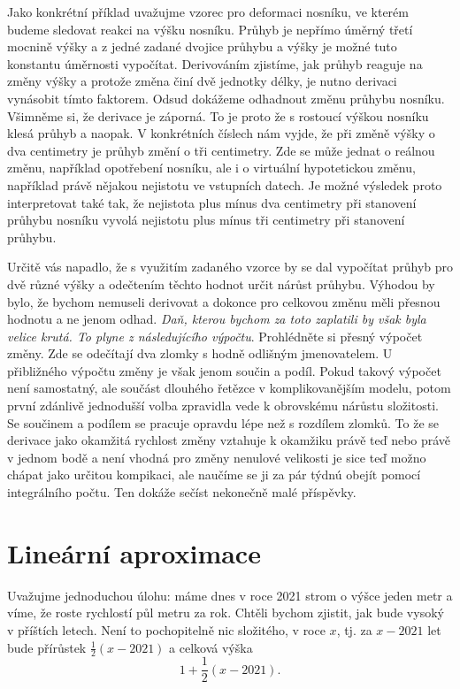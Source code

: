 \documentclass[12pt]{article}
\begin{document}
Jako konkrétní příklad uvažujme vzorec pro deformaci nosníku, ve kterém budeme sledovat reakci na výšku nosníku. Průhyb je nepřímo úměrný třetí mocnině výšky a z jedné zadané dvojice průhybu a výšky je možné tuto konstantu úměrnosti vypočítat. Derivováním zjistíme, jak průhyb reaguje na změny výšky a protože změna činí dvě jednotky délky, je nutno derivaci vynásobit tímto faktorem. Odsud dokážeme odhadnout změnu průhybu nosníku. Všimněme si, že derivace je záporná. To je proto že s rostoucí výškou nosníku klesá průhyb a naopak. V konkrétních číslech nám vyjde, že při změně výšky o dva centimetry je průhyb změní o tři centimetry. Zde se může jednat o reálnou změnu, například opotřebení nosníku, ale i o virtuální hypotetickou změnu, například právě nějakou nejistotu ve vstupních datech. Je možné výsledek proto interpretovat také tak, že nejistota plus mínus dva centimetry při stanovení průhybu nosníku vyvolá nejistotu plus mínus tři centimetry při stanovení průhybu.

Určitě vás napadlo, že s využitím zadaného vzorce by se dal vypočítat průhyb pro dvě různé výšky a odečtením těchto hodnot určit nárůst průhybu. Výhodou by bylo, že bychom nemuseli derivovat a dokonce pro celkovou změnu měli přesnou hodnotu a ne jenom odhad. \textit{Daň, kterou bychom za toto zaplatili by však byla velice krutá. To plyne z následujícího výpočtu}. Prohlédněte si přesný výpočet změny. Zde se odečítají dva zlomky s hodně odlišným jmenovatelem. U přibližného výpočtu změny je však jenom součin a podíl. Pokud takový výpočet není samostatný, ale součást dlouhého řetězce v komplikovanějším modelu, potom první zdánlivě jednodušší volba zpravidla vede k obrovskému nárůstu složitosti. Se součinem a podílem se pracuje opravdu lépe než s rozdílem zlomků. To že se derivace jako okamžitá rychlost změny vztahuje k okamžiku právě teď nebo právě v jednom bodě a není vhodná pro změny nenulové velikosti je sice teď možno chápat jako určitou kompikaci, ale naučíme se ji za pár týdnú obejít pomocí integrálního počtu. Ten dokáže sečíst nekonečně malé příspěvky.

\section*{Lineární aproximace}

Uvažujme jednoduchou úlohu: máme dnes v roce 2021 strom o výšce jeden metr a víme, že roste rychlostí půl metru za rok. Chtěli bychom zjistit, jak bude vysoký v příštích letech. Není to pochopitelně nic složitého, v roce $x$, tj. za $x-2021$ let bude přírůstek $\frac 12 (x-2021)$ a celková výška $$1+\frac 12 (x-2021).$$
\end{document}
